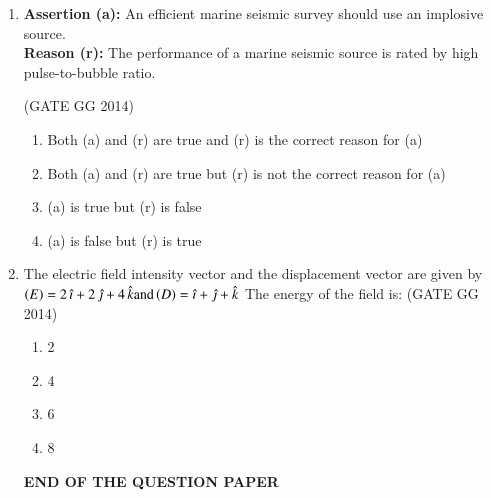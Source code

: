 \documentclass[journal]{IEEEtran}
\begin{document}
\begin{enumerate}[start=26]
\item \textbf{Assertion (a):} An efficient marine seismic survey should use an implosive source. \\
\textbf{Reason (r):} The performance of a marine seismic source is rated by high pulse-to-bubble ratio.

\hfill(GATE GG 2014)
\begin{enumerate}
    \item Both (a) and (r) are true and (r) is the correct reason for (a)
    \item Both (a) and (r) are true but (r) is not the correct reason for (a)
    \item (a) is true but (r) is false
    \item (a) is false but (r) is true
\end{enumerate}

\item The electric field intensity vector  and the displacement vector  are given by $\left(E\right) = 2 \, \hat{\imath} + 2 \, \hat{\jmath} + 4 \, \hat{k} \text{and}  \left(D\right) = \hat{\imath} + \hat{\jmath} + \hat{k}$
The energy of the field is:
\hfill(GATE GG 2014)
\begin{multicols}{2}
    \begin{enumerate}
    \item 2
    \item 4
    \item 6
    \item 8
\end{enumerate}
\end{multicols}
\vspace{0.6cm}
\textbf{END OF THE QUESTION PAPER}
\end{enumerate}
\end{document}
